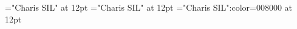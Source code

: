 \documentclass[a4paper]{article}
\begin{document}
\pagestyle{plain}
\sloppy
\setlength{\parfillskip}{0pt plus 1fil}
\font\ta="Charis SIL" at 12pt
\font\tbta="Charis SIL" at 12pt
\font\tctbta="Charis SIL":color=008000 at 12pt

\pagestyle{fancy} 





\end{document}
